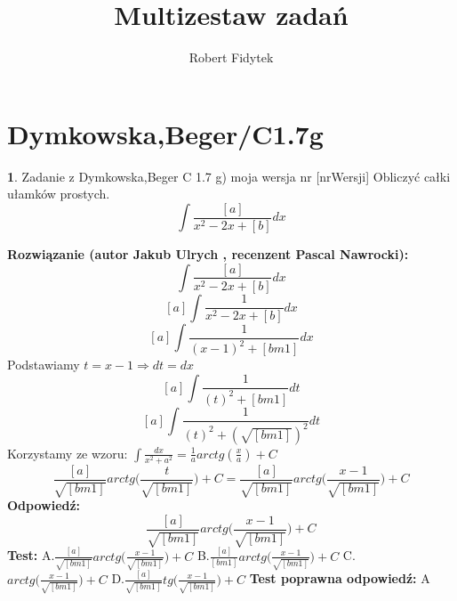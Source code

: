 \documentclass[12pt, a4paper]{article}
\title{Multizestaw zadań}
\author{Robert Fidytek}
\date{}
\theoremstyle{definition} %
\newtheorem{zad}{}
\newcommand{\kategoria}[1]{\section{#1}} %
\newcommand{\zadStart}[1]{\begin{zad}#1\newline} %
\newcommand{\zadStop}{\end{zad}}   %
\newcommand{\rozwStart}[2]{\noindent \textbf{Rozwiązanie (autor #1 , recenzent #2): }\newline} %
\newcommand{\rozwStop}{\newline}                                            %
\newcommand{\odpStart}{\noindent \textbf{Odpowiedź:}\newline}    %
\newcommand{\odpStop}{\newline}                                             %
\newcommand{\testStart}{\noindent \textbf{Test:}\newline} %
\newcommand{\testStop}{\newline} %
\newcommand{\kluczStart}{\noindent \textbf{Test poprawna odpowiedź:}\newline} %
\newcommand{\kluczStop}{\newline} %
\begin{document}
\maketitle


\kategoria{Dymkowska,Beger/C1.7g}
\zadStart{Zadanie z Dymkowska,Beger C 1.7 g) moja wersja nr [nrWersji]}
Obliczyć całki ułamków prostych.$$\int\frac{[a]}{x^{2}-2x+[b]}dx$$
\zadStop
\rozwStart{Jakub Ulrych}{Pascal Nawrocki}
$$\int\frac{[a]}{x^{2}-2x+[b]}dx$$
$$[a]\int\frac{1}{x^{2}-2x+[b]}dx$$
$$[a]\int\frac{1}{(x-1)^{2}+[bm1]}dx$$
Podstawiamy $t=x-1\Rightarrow dt=dx$
$$[a]\int\frac{1}{(t)^{2}+[bm1]}dt$$
$$[a]\int\frac{1}{(t)^{2}+(\sqrt{[bm1]})^{2}}dt$$
Korzystamy ze wzoru: $\int\frac{dx}{x^{2}+a^{2}}=\frac{1}{a}arctg(\frac{x}{a})+C$
$$\frac{[a]}{\sqrt{[bm1]}}arctg\bigg(\frac{t}{\sqrt{[bm1]}}\bigg)+C=\frac{[a]}{\sqrt{[bm1]}}arctg\bigg(\frac{x-1}{\sqrt{[bm1]}}\bigg)+C$$
\rozwStop
\odpStart
$$\frac{[a]}{\sqrt{[bm1]}}arctg\bigg(\frac{x-1}{\sqrt{[bm1]}}\bigg)+C$$
\odpStop
\testStart
A.$\frac{[a]}{\sqrt{[bm1]}}arctg\big(\frac{x-1}{\sqrt{[bm1]}}\big)+C$
B.$\frac{[a]}{[bm1]}arctg\big(\frac{x-1}{\sqrt{[bm1]}}\big)+C$
C.$arctg\big(\frac{x-1}{\sqrt{[bm1]}}\big)+C$
D.$\frac{[a]}{\sqrt{[bm1]}}tg\big(\frac{x-1}{\sqrt{[bm1]}}\big)+C$
\testStop
\kluczStart
A
\kluczStop
\end{document}
